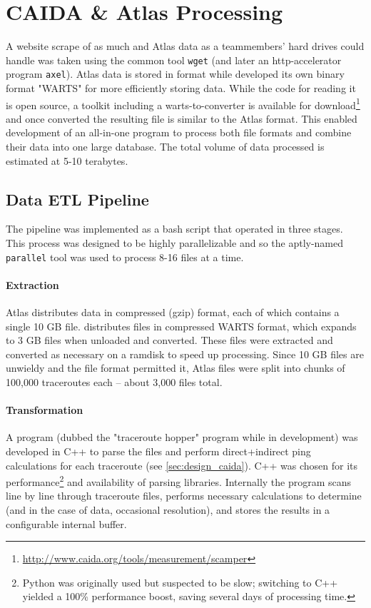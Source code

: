 \section{CAIDA \& Atlas Processing}\label{sec:caida_impl}

A website scrape of as much \caida and \ripe Atlas data as a teammembers' hard drives could handle was taken using the common tool \texttt{wget} (and later an http-accelerator program \texttt{axel}). \ripe Atlas data is stored in \json format while \caida developed its own binary format "WARTS" for more efficiently storing data. While the code for reading it is open source, a toolkit including a warts-to-\json converter is available for download\footnote{\url{http://www.caida.org/tools/measurement/scamper}} and once converted the resulting \json file is similar to the \ripe Atlas format. This enabled development of an all-in-one \etl program to process both file formats and combine their data into one large database. The total volume of data processed is estimated at 5-10 terabytes.

\subsection{Data ETL Pipeline}

The pipeline was implemented as a bash script that operated in three stages. This process was designed to be highly parallelizable and so the aptly-named \texttt{parallel} tool \cite{Tange2011} was used to process 8-16 files at a time.

\paragraph{Extraction} \ripe Atlas distributes data in compressed (gzip) format, each of which contains a single 10 GB \json file. \caida distributes files in compressed WARTS format, which expands to 3 GB \json files when unloaded and converted. These files were extracted and converted as necessary on a ramdisk to speed up processing. Since 10 GB files are unwieldy and the file format permitted it, \ripe Atlas files were split into chunks of 100,000 traceroutes each -- about 3,000 files total.

\paragraph{Transformation} A program (dubbed the "traceroute hopper" program while in development) was developed in C++ to parse the \json files and perform direct+indirect ping calculations for each traceroute (see \autoref{sec:design_caida}). C++ was chosen for its performance\footnote{Python was originally used but suspected to be slow; switching to C++ yielded a 100\% performance boost, saving several days of processing time.} and availability of \json parsing libraries. Internally the program scans line by line through traceroute files, performs necessary calculations to determine \rtts (and in the case of \caida data, occasional \dns resolution), and stores the results in a configurable internal buffer.

